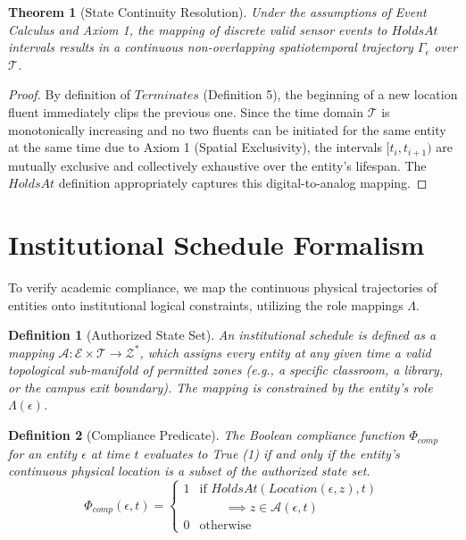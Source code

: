 \documentclass[conference]{IEEEtran}
\newtheorem{theorem}{Theorem}
\newtheorem{definition}{Definition}
\newcommand{\E}{\mathcal{E}} %
\newcommand{\Z}{\mathcal{Z}} %
\newcommand{\T}{\mathcal{T}} %
\newcommand{\Auth}{\mathcal{A}} %
\begin{document}
\begin{theorem}[State Continuity Resolution]
Under the assumptions of Event Calculus and Axiom 1, the mapping of discrete valid sensor events to $HoldsAt$ intervals results in a continuous non-overlapping spatiotemporal trajectory $\Gamma_\epsilon$ over $\T$.
\end{theorem}
\begin{proof}
By definition of $Terminates$ (Definition 5), the beginning of a new location fluent immediately clips the previous one. Since the time domain $\T$ is monotonically increasing and no two fluents can be initiated for the same entity at the same time due to Axiom 1 (Spatial Exclusivity), the intervals $[t_i, t_{i+1})$ are mutually exclusive and collectively exhaustive over the entity’s lifespan. The $HoldsAt$ definition appropriately captures this digital-to-analog mapping.
\end{proof}

\section{Institutional Schedule Formalism}

To verify academic compliance, we map the continuous physical trajectories of entities onto institutional logical constraints, utilizing the role mappings $\Lambda$.

\begin{definition}[Authorized State Set]
An institutional schedule is defined as a mapping $\Auth: \E \times \T \to \Z^*$, which assigns every entity at any given time a valid topological sub-manifold of permitted zones (e.g., a specific classroom, a library, or the campus exit boundary). The mapping is constrained by the entity's role $\Lambda(\epsilon)$.
\end{definition}

\begin{definition}[Compliance Predicate]
The Boolean compliance function $\Phi_{comp}$ for an entity $\epsilon$ at time $t$ evaluates to True (1) if and only if the entity's continuous physical location is a subset of the authorized state set.
\begin{equation}
\Phi_{comp}(\epsilon, t) = \begin{cases} 
1 & \text{if } HoldsAt(Location(\epsilon, z), t) \\
  & \qquad \implies z \in \Auth(\epsilon, t) \\
0 & \text{otherwise} 
\end{cases}
\end{equation}
\end{definition}
\end{document}
